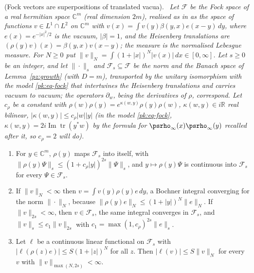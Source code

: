 \documentclass[10pt]{amsart}
\theoremstyle{definition}
\theoremstyle{remark}
\newcommand{\C}{\mathbb C}
\newcommand{\R}{\mathbb R}
\newcommand{\Iml}{\operatorname{Im}}
\newenvironment{quotedthm}[2]{\par\medskip\noindent\begingroup
  \textbf{#1}#2.\ \itshape\ignorespaces}{\endgroup\par\medskip}
\begin{document}
\begin{quotedthm}{\cite[Lemma~3.30]{P53}}{ (Fock vectors are superpositions of translated vacua)}
Let $\mathcal F$ be the Fock space of a real hermitian space $\C^m$ (real dimension $2m$), realised as in
{\cite[\S5.1.4]{P54}} as the space of functions $v\in L^1\cap L^2$ on $\C^m$ with $v(x)=\int v(y)\beta(y,x)
e(x-y)\,dy$, where $e(x)=e^{-|x|^2/2}$ is the vacuum, $|\beta|=1$, and the Heisenberg translations are
$(\rho(y)v)(x)=\beta(y,x)v(x-y)$; the measure is the normalised Lebesgue measure. For $N\ge0$ put
$\|v\|_N=\int(1+|x|)^N|v(x)|\,dx\in[0,\infty]$. Let $s\ge0$ be an integer, and let $\|\cdot\|_s$ and
$\mathcal F_s\subseteq\mathcal F$ be the norm and the Banach space of Lemma~\ref{pz:growth} (with $D=m$),
transported by the unitary isomorphism with the model \eqref{pk:eq-fock} that intertwines the
Heisenberg translations and carries vacuum to vacuum; the operators $\partial_w$, being the derivatives
of $\rho$, correspond. Let $c_\rho$ be a constant with
$\rho(w)\rho(y)=e^{\kappa(w,y)}\rho(y)\rho(w)$, $\kappa(w,y)\in i\R$ real bilinear,
$|\kappa(w,y)|\le c_\rho|w||y|$ (in the model \eqref{pk:eq-fock}, $\kappa(w,y)=2i\Iml\operatorname{tr}(y^*w)$ by the
formula for $\psrho_\infty(x)\psrho_\infty(y)$ recalled after it, so $c_\rho=2$ will do).
\begin{enumerate}
\item[\textup{(a)}] For $y\in\C^m$, $\rho(y)$ maps $\mathcal F_s$ into itself, with
$\|\rho(y)\Psi\|_s\le(1+c_\rho|y|)^{2s}\|\Psi\|_s$, and $y\mapsto\rho(y)\Psi$ is continuous into
$\mathcal F_s$ for every $\Psi\in\mathcal F_s$.
\item[\textup{(b)}] If $\|v\|_N<\infty$ then $v=\int v(y)\rho(y)e\,dy$, a Bochner integral converging for
the norm $\|\cdot\|_N$, because $\|\rho(y)e\|_N\le(1+|y|)^N\|e\|_N$. If $\|v\|_{2s}<\infty$, then
$v\in\mathcal F_s$, the same integral converges in $\mathcal F_s$, and $\|v\|_s\le c_1\|v\|_{2s}$ with
$c_1=\max(1,c_\rho)^{2s}\|e\|_s$.
\item[\textup{(c)}] Let $\ell$ be a continuous linear functional on $\mathcal F_s$ with $|\ell(\rho(z)e)|\le
S(1+|z|)^N$ for all $z$. Then $|\ell(v)|\le S\|v\|_N$ for every $v$ with $\|v\|_{\max(N,2s)}<\infty$.
\end{enumerate}
\end{quotedthm}
\end{document}
